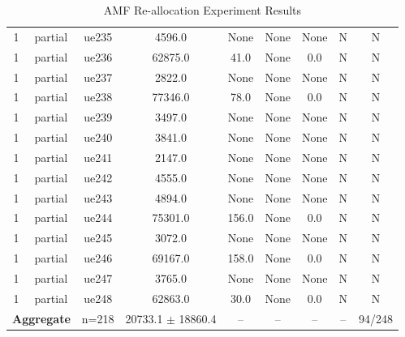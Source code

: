 \begin{table}[ht]
\begin{tabular}{|c|c|c|c|c|c|c|c|c|}
1 & partial & ue235 & 4596.0 & None & None & None & N & N \\
1 & partial & ue236 & 62875.0 & 41.0 & None & 0.0 & N & N \\
1 & partial & ue237 & 2822.0 & None & None & None & N & N \\
1 & partial & ue238 & 77346.0 & 78.0 & None & 0.0 & N & N \\
1 & partial & ue239 & 3497.0 & None & None & None & N & N \\
1 & partial & ue240 & 3841.0 & None & None & None & N & N \\
1 & partial & ue241 & 2147.0 & None & None & None & N & N \\
1 & partial & ue242 & 4555.0 & None & None & None & N & N \\
1 & partial & ue243 & 4894.0 & None & None & None & N & N \\
1 & partial & ue244 & 75301.0 & 156.0 & None & 0.0 & N & N \\
1 & partial & ue245 & 3072.0 & None & None & None & N & N \\
1 & partial & ue246 & 69167.0 & 158.0 & None & 0.0 & N & N \\
1 & partial & ue247 & 3765.0 & None & None & None & N & N \\
1 & partial & ue248 & 62863.0 & 30.0 & None & 0.0 & N & N \\
\multicolumn{2}{|c|}{\textbf{Aggregate}} & n=218 & 20733.1 $\pm$ 18860.4 & -- & -- & -- & -- & 94/248 \\
\hline
\end{tabular}
\caption{AMF Re-allocation Experiment Results}
\label{tab:amf_realloc}
\end{table}
